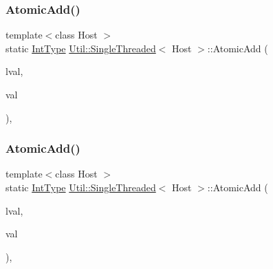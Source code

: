 \subsubsection{\texorpdfstring{AtomicAdd()}{AtomicAdd()}\hspace{0.1cm}{\footnotesize\ttfamily [1/3]}}
{\footnotesize\ttfamily template$<$class Host $>$ \\
static \mbox{\hyperlink{classUtil_1_1SingleThreaded_a35932213fb0c15a7b67ced79bc2af4c6}{Int\+Type}} \mbox{\hyperlink{classUtil_1_1SingleThreaded}{Util\+::\+Single\+Threaded}}$<$ Host $>$\+::Atomic\+Add (\begin{DoxyParamCaption}\item[{volatile \mbox{\hyperlink{classUtil_1_1SingleThreaded_a35932213fb0c15a7b67ced79bc2af4c6}{Int\+Type}} \&}]{lval,  }\item[{\mbox{\hyperlink{classUtil_1_1SingleThreaded_a35932213fb0c15a7b67ced79bc2af4c6}{Int\+Type}}}]{val }\end{DoxyParamCaption})\hspace{0.3cm}{\ttfamily [inline]}, {\ttfamily [static]}}

\mbox{\label{classUtil_1_1SingleThreaded_a8ecefde4f84af6dc4632e82d4898da2e}} 
\subsubsection{\texorpdfstring{AtomicAdd()}{AtomicAdd()}\hspace{0.1cm}{\footnotesize\ttfamily [2/3]}}
{\footnotesize\ttfamily template$<$class Host $>$ \\
static \mbox{\hyperlink{classUtil_1_1SingleThreaded_a35932213fb0c15a7b67ced79bc2af4c6}{Int\+Type}} \mbox{\hyperlink{classUtil_1_1SingleThreaded}{Util\+::\+Single\+Threaded}}$<$ Host $>$\+::Atomic\+Add (\begin{DoxyParamCaption}\item[{volatile \mbox{\hyperlink{classUtil_1_1SingleThreaded_a35932213fb0c15a7b67ced79bc2af4c6}{Int\+Type}} \&}]{lval,  }\item[{\mbox{\hyperlink{classUtil_1_1SingleThreaded_a35932213fb0c15a7b67ced79bc2af4c6}{Int\+Type}}}]{val }\end{DoxyParamCaption})\hspace{0.3cm}{\ttfamily [inline]}, {\ttfamily [static]}}

